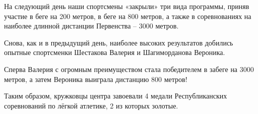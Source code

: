 На следующий день наши спортсмены «закрыли» три вида программы, приняв участие
в беге на 200 метров, в беге на 800 метров, а также в соревнованиях на наиболее
длинной дистанции Первенства – 3000 метров.

Снова, как и в предыдущий день, наиболее высоких результатов добились опытные
спортсменки Шестакова Валерия и Шагиморданова Вероника.

Сперва Валерия с огромным преимуществом стала победителем в забеге на 3000
метров, а затем Вероника выиграла дистанцию 800 метров!


Таким образом, кружковцы центра завоевали 4 медали Республиканских соревнований
по лёгкой атлетике, 2 из которых золотые.
